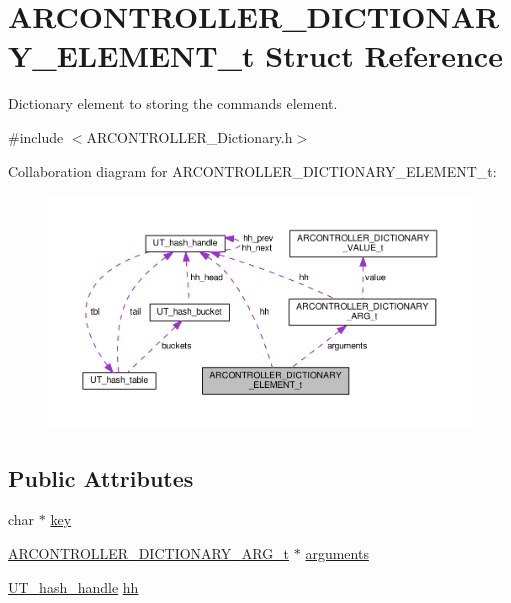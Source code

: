 \hypertarget{struct_a_r_c_o_n_t_r_o_l_l_e_r___d_i_c_t_i_o_n_a_r_y___e_l_e_m_e_n_t__t}{}\section{A\+R\+C\+O\+N\+T\+R\+O\+L\+L\+E\+R\+\_\+\+D\+I\+C\+T\+I\+O\+N\+A\+R\+Y\+\_\+\+E\+L\+E\+M\+E\+N\+T\+\_\+t Struct Reference}
\label{struct_a_r_c_o_n_t_r_o_l_l_e_r___d_i_c_t_i_o_n_a_r_y___e_l_e_m_e_n_t__t}


Dictionary element to storing the commands element.  




{\ttfamily \#include $<$A\+R\+C\+O\+N\+T\+R\+O\+L\+L\+E\+R\+\_\+\+Dictionary.\+h$>$}



Collaboration diagram for A\+R\+C\+O\+N\+T\+R\+O\+L\+L\+E\+R\+\_\+\+D\+I\+C\+T\+I\+O\+N\+A\+R\+Y\+\_\+\+E\+L\+E\+M\+E\+N\+T\+\_\+t\+:
\nopagebreak
\begin{figure}[H]
\begin{center}
\leavevmode
\includegraphics[width=350pt]{struct_a_r_c_o_n_t_r_o_l_l_e_r___d_i_c_t_i_o_n_a_r_y___e_l_e_m_e_n_t__t__coll__graph}
\end{center}
\end{figure}
\subsection*{Public Attributes}
\begin{DoxyCompactItemize}
\item 
char $\ast$ \hyperlink{struct_a_r_c_o_n_t_r_o_l_l_e_r___d_i_c_t_i_o_n_a_r_y___e_l_e_m_e_n_t__t_a057300a8b5bc253c3cb3adb089a0d614}{key}
\item 
\hyperlink{struct_a_r_c_o_n_t_r_o_l_l_e_r___d_i_c_t_i_o_n_a_r_y___a_r_g__t}{A\+R\+C\+O\+N\+T\+R\+O\+L\+L\+E\+R\+\_\+\+D\+I\+C\+T\+I\+O\+N\+A\+R\+Y\+\_\+\+A\+R\+G\+\_\+t} $\ast$ \hyperlink{struct_a_r_c_o_n_t_r_o_l_l_e_r___d_i_c_t_i_o_n_a_r_y___e_l_e_m_e_n_t__t_acc207c868e8f2057d2e43bf6f2fb52ab}{arguments}
\item 
\hyperlink{struct_u_t__hash__handle}{U\+T\+\_\+hash\+\_\+handle} \hyperlink{struct_a_r_c_o_n_t_r_o_l_l_e_r___d_i_c_t_i_o_n_a_r_y___e_l_e_m_e_n_t__t_a4e5c903e4b131c95d61fe41bc3f190a2}{hh}
\end{DoxyCompactItemize}


